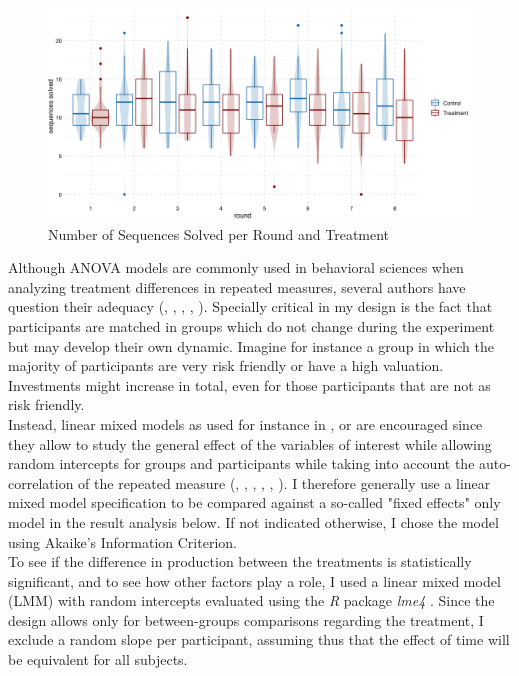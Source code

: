 \begin{figure}
    \centering
    \includegraphics[width=\textwidth]{graphs/production_boxplot.png}
    \caption{Number of Sequences Solved per Round and Treatment}
    \label{fig:production_boxplot}
\end{figure}

Although ANOVA models are commonly used in behavioral sciences when analyzing treatment differences in repeated measures, several authors have question their adequacy (\cite{camilli1987}, \cite{vasey1987}, \cite{jaeger2008}, \cite{locker2007}, \cite{krueger2004}). Specially critical in my design is the fact that participants are matched in groups which do not change during the experiment but may develop their own dynamic. Imagine for instance a group in which the majority of participants are very risk friendly or have a high valuation. Investments might increase in total, even for those participants that are not as risk friendly.\\ 
    
Instead, linear mixed models as used for instance in \cite{szaszi2018}, \cite{holsen2009} or \cite{yue2010} are encouraged since they allow to study the general effect of the variables of interest while allowing random intercepts for groups and participants while taking into account the auto-correlation of the repeated measure (\cite{galecki2013}, \cite{bolker2009}, \cite{mcculloch2015}, \cite{barr2013}, \cite{baayen2008}, \cite{fitzmaurice2015}). I therefore generally use a linear mixed model specification to be compared against a so-called "fixed effects" only model in the result analysis below. If not indicated otherwise, I chose the model using Akaike's Information Criterion.\\
    
To see if the difference in production between the treatments is statistically significant, and to see how other factors play a role, I used a linear mixed model (LMM) with random intercepts evaluated using the \textit{R} package \textit{lme4} \citep{bates2015}. Since the design allows only for between-groups comparisons regarding the treatment, I exclude a random slope per participant, assuming thus that the effect of time will be equivalent for all subjects.\\

